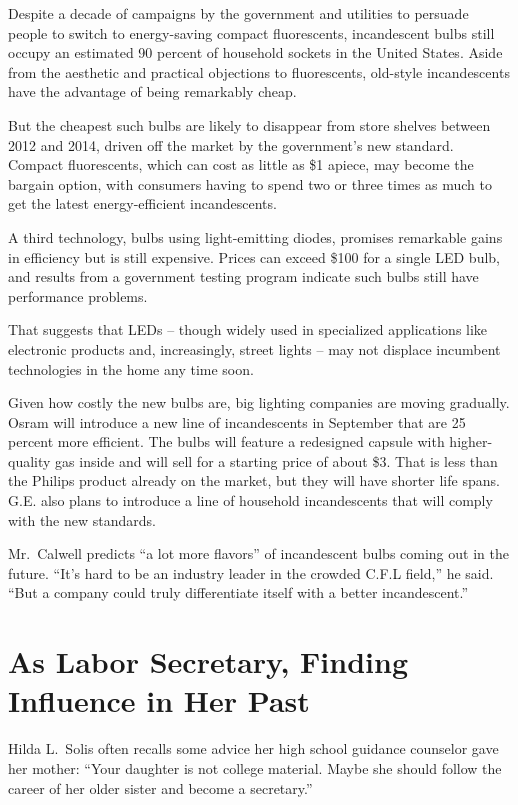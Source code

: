 ﻿\documentclass[12pt]{article}
\begin{document}
Despite a decade of campaigns by the government and utilities to persuade people to switch to
energy-saving compact fluorescents, incandescent bulbs still occupy an estimated 90 percent of
household sockets in the United States. Aside from the aesthetic and practical objections to
fluorescents, old-style incandescents have the advantage of being remarkably cheap.

But the cheapest such bulbs are likely to disappear from store shelves between 2012 and 2014, driven
off the market by the government's new standard. Compact fluorescents, which can cost as little as
\$1 apiece, may become the bargain option, with consumers having to spend two or three times as much
to get the latest energy-efficient incandescents.

A third technology, bulbs using light-emitting diodes, promises remarkable gains in efficiency but
is still expensive. Prices can exceed \$100 for a single LED bulb, and results from a government
testing program indicate such bulbs still have performance problems.

That suggests that LEDs -- though widely used in specialized applications like electronic products
and, increasingly, street lights -- may not displace incumbent technologies in the home any time
soon.

Given how costly the new bulbs are, big lighting companies are moving gradually. Osram will
introduce a new line of incandescents in September that are 25 percent more efficient. The bulbs
will feature a redesigned capsule with higher-quality gas inside and will sell for a starting price
of about \$3. That is less than the Philips product already on the market, but they will have
shorter life spans. G.E. also plans to introduce a line of household incandescents that will comply
with the new standards.

Mr.~Calwell predicts ``a lot more flavors'' of incandescent bulbs coming out in the future. ``It's
hard to be an industry leader in the crowded C.F.L field,'' he said. ``But a company could truly
differentiate itself with a better incandescent.''

\section{As Labor Secretary, Finding Influence in Her Past}

Hilda L.~Solis often recalls some advice her high school guidance counselor gave her mother: ``Your
daughter is not college material. Maybe she should follow the career of her older sister and become
a secretary.''
\end{document}
